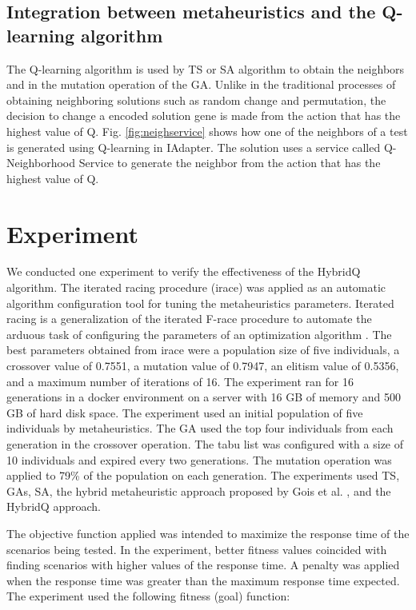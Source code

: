 \documentclass{bmcart}
\begin{document}
\subsection{Integration between metaheuristics and the Q-learning algorithm }

The Q-learning algorithm is used by TS or SA algorithm to obtain the neighbors and in the mutation operation of the GA. Unlike in the traditional processes of obtaining neighboring solutions such as random change and permutation, the decision to change a encoded solution gene is made from the action that has the highest value of Q. Fig. \ref{fig:neighservice} shows how one of the neighbors of a test is generated using Q-learning in IAdapter. The solution uses a service called Q-Neighborhood Service to generate the neighbor from the action that has the highest value of Q.


\section{Experiment}

We conducted one experiment to verify the effectiveness of the HybridQ algorithm. The iterated racing procedure (irace) was applied as an automatic algorithm configuration tool for tuning the metaheuristics parameters. Iterated racing is a generalization of the iterated F-race procedure to automate the arduous task of configuring the parameters of an optimization algorithm \cite{ManuelLopez-IbanezJeremieDubois-LacosteLesliePerezCaceresMauroBirattari2016}. The best parameters obtained from irace were a population size of five individuals, a crossover value of 0.7551, a mutation value of 0.7947, an elitism value of 0.5356, and a maximum number of iterations of 16. The experiment ran for 16 generations in a docker environment on a server with 16 GB of memory and 500 GB of hard disk space. The experiment used an initial population of five individuals by metaheuristics. The GA used the top four individuals from each generation in the crossover operation. The tabu list was configured with a size of 10 individuals and expired every two generations.  The mutation operation was applied to 79\% of the population on each generation. The experiments used TS, GAs, SA, the hybrid metaheuristic approach proposed by Gois et al. \citep{Gois2016}, and the HybridQ approach. 


The objective function applied was intended to maximize the response time of the scenarios being tested.  In the experiment, better fitness values coincided with finding scenarios with higher values of the response time. A penalty was applied when the response time was greater than the  maximum response time expected. The experiment used the following fitness (goal) function:
\end{document}
